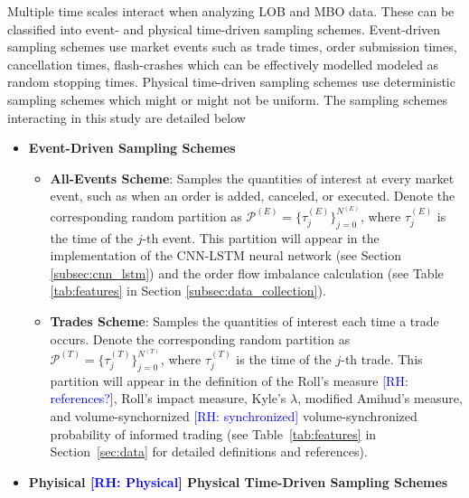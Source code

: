 \documentclass[10pt,a4paper,oneside]{article}
\newcommand{\rh}[1]{\textcolor{blue}{\textsf{[RH: #1]}}}
\providecommand{\DIFaddtex}[1]{{\protect\color{blue} \sf #1}} %
\providecommand{\DIFdeltex}[1]{{\protect\color{red} \scriptsize #1}} %
\providecommand{\DIFaddbegin}{} %
\providecommand{\DIFaddend}{} %
\providecommand{\DIFdelbegin}{} %
\providecommand{\DIFdelend}{} %
\providecommand{\DIFadd}[1]{\texorpdfstring{\DIFaddtex{#1}}{#1}} %
\providecommand{\DIFdel}[1]{\texorpdfstring{\DIFdeltex{#1}}{}} %
\newcommand{\DIFscaledelfig}{0.5}
\newlength{\DIFdelgraphicswidth} %
\newlength{\DIFdelgraphicsheight} %
\newcommand{\DIFaddincludegraphics}[2][]{{\color{blue}\fbox{\DIFOincludegraphics[#1]{#2}}}} %
\newcommand{\DIFdelincludegraphics}[2][]{%
\sbox{\DIFdelgraphicsbox}{\DIFOincludegraphics[#1]{#2}}%
\settoboxwidth{\DIFdelgraphicswidth}{\DIFdelgraphicsbox} %
\settoboxtotalheight{\DIFdelgraphicsheight}{\DIFdelgraphicsbox} %
\scalebox{\DIFscaledelfig}{%
\parbox[b]{\DIFdelgraphicswidth}{\usebox{\DIFdelgraphicsbox}\\[-\baselineskip] \rule{\DIFdelgraphicswidth}{0em}}\llap{\resizebox{\DIFdelgraphicswidth}{\DIFdelgraphicsheight}{%
\setlength{\unitlength}{\DIFdelgraphicswidth}%
\begin{picture}(1,1)%
\thicklines\linethickness{2pt} %
{\color[rgb]{1,0,0}\put(0,0){\framebox(1,1){}}}%
{\color[rgb]{1,0,0}\put(0,0){\line( 1,1){1}}}%
{\color[rgb]{1,0,0}\put(0,1){\line(1,-1){1}}}%
\end{picture}%
}\hspace*{3pt}}} %
} %
\DeclareRobustCommand{\DIFaddbegin}{\DIFOaddbegin \let\includegraphics\DIFaddincludegraphics} %
\DeclareRobustCommand{\DIFaddend}{\DIFOaddend \let\includegraphics\DIFOincludegraphics} %
\DeclareRobustCommand{\DIFdelbegin}{\DIFOdelbegin \let\includegraphics\DIFdelincludegraphics} %
\DeclareRobustCommand{\DIFdelend}{\DIFOaddend \let\includegraphics\DIFOincludegraphics} %
\begin{document}
Multiple time scales interact when analyzing LOB and MBO data. These can be classified into event- and physical time-driven sampling schemes. Event-driven sampling schemes use market events such as trade times, order submission times, cancellation times, flash-crashes which can be effectively \DIFdelbegin \DIFdel{modelled }\DIFdelend \DIFaddbegin \DIFadd{modeled }\DIFaddend as random stopping times. Physical time-driven sampling schemes use deterministic sampling schemes which might or might not be uniform. The sampling schemes interacting in this study are detailed below

\begin{itemize}
    \item \textbf{Event-Driven Sampling Schemes}
          \begin{itemize}
              \item \textbf{All-Events Scheme}: Samples the quantities of interest at every market event, such as when an order is added, canceled, or executed. Denote the corresponding random partition as $\mathcal{P}^{(E)} = \{\tau^{(E)}_j\}_{j=0}^{N^{(E)}}$, where $\tau^{(E)}_j$ is the time of the $j$-th event. This partition will appear in the implementation of the CNN-LSTM neural network (see Section \ref{subsec:cnn_lstm}) and the order flow imbalance calculation (see Table \ref{tab:features} in Section \ref{subsec:data_collection}).
              \item \textbf{Trades Scheme}: Samples the quantities of interest each time a trade occurs. Denote the corresponding random partition as $\mathcal{P}^{(T)} = \{\tau^{(T)}_j\}_{j=0}^{N^{(T)}}$, where $\tau^{(T)}_j$ is the time of the $j$-th trade. This partition will appear in the definition of \DIFdelbegin \DIFdel{the }\DIFdelend Roll's measure\DIFdelbegin \DIFdel{\rh{references?}}\DIFdelend , Roll's impact measure, Kyle's $\lambda$, modified Amihud's measure, and \DIFdelbegin \DIFdel{volume-synchornized  \rh{synchronized} }\DIFdelend \DIFaddbegin \DIFadd{volume-synchronized }\DIFaddend probability of informed trading \DIFaddbegin \DIFadd{(see Table~\ref{tab:features} in Section~\ref{sec:data} for detailed definitions and references)}\DIFaddend .
          \end{itemize}
    \item \textbf{\DIFdelbegin \DIFdel{Phyisical \rh{Physical} }\DIFdelend \DIFaddbegin \DIFadd{Physical }\DIFaddend Time-Driven Sampling Schemes}
        \begin{itemize}

\end{itemize}
\end{itemize}
\end{document}
